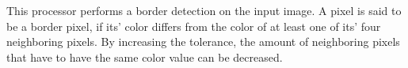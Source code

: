 This processor performs a border detection on the input image. A pixel is said to be a border pixel, if its' color differs from the color of at least one of its' four neighboring pixels. By increasing the tolerance, the amount of neighboring pixels that have to have the same color value can be decreased.